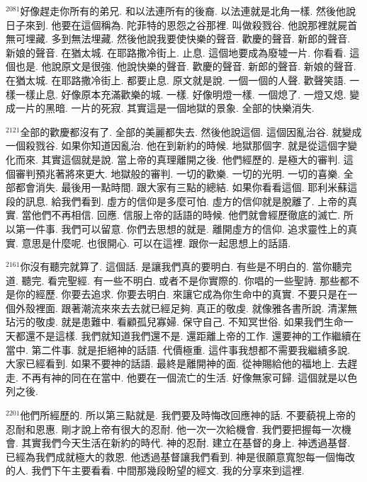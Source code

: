\documentclass{book}
\begin{document}
$^{2081}$好像趕走你所有的弟兄.
和以法連所有的後裔.
以法連就是北角一樣.
然後他說日子來到.
他要在這個稱為.
陀菲特的恩怨之谷那裡.
叫做殺戮谷.
他說那裡就屍首無可埋藏.
多到無法埋藏.
然後他說我要使快樂的聲音.
歡慶的聲音.
新郎的聲音.
新娘的聲音.
在猶太城.
在耶路撒冷街上.
止息.
這個地要成為廢墟一片.
你看看.
這個也是.
他說原文是很強.
他說快樂的聲音.
歡慶的聲音.
新郎的聲音.
新娘的聲音.
在猶太城.
在耶路撒冷街上.
都要止息.
原文就是說.
一個一個的人聲.
歡聲笑語.
一樣一樣止息.
好像原本充滿歡樂的城.
一樣.
好像明燈一樣.
一個熄了.
一燈又熄.
變成一片的黑暗.
一片的死寂.
其實這是一個地獄的景象.
全部的快樂消失.

$^{2121}$全部的歡慶都沒有了.
全部的美麗都失去.
然後他說這個.
這個因亂治谷.
就變成一個殺戮谷.
如果你知道因亂治.
他在到新約的時候.
地獄那個字.
就是從這個字變化而來.
其實這個就是說.
當上帝的真理離開之後.
他們經歷的.
是極大的審判.
這個審判預兆著將來更大.
地獄般的審判.
一切的歡樂.
一切的光明.
一切的喜樂.
全部都會消失.
最後用一點時間.
跟大家有三點的總結.
如果你看看這個.
耶利米蘇這段的訊息.
給我們看到.
虛方的信仰是多麼可怕.
虛方的信仰就是脫離了.
上帝的真實.
當他們不再相信.
回應.
信服上帝的話語的時候.
他們就會經歷徹底的滅亡.
所以第一件事.
我們可以留意.
你們去思想的就是.
離開虛方的信仰.
追求靈性上的真實.
意思是什麼呢.
也很開心.
可以在這裡.
跟你一起思想上的話語.

$^{2161}$你沒有聽完就算了.
這個話.
是讓我們真的要明白.
有些是不明白的.
當你聽完道.
聽完.
看完聖經.
有一些不明白.
或者不是你實際的.
你唱的一些聖詩.
那些都不是你的經歷.
你要去追求.
你要去明白.
來讓它成為你生命中的真實.
不要只是在一個外殼裡面.
跟著潮流來來去去就已經足夠.
真正的敬虔.
就像雅各書所說.
清潔無玷污的敬虔.
就是患難中.
看顧孤兒寡婦.
保守自己.
不知冥世俗.
如果我們生命一天都還不是這樣.
我們就知道我們還不是.
還距離上帝的工作.
還要神的工作繼續在當中.
第二件事.
就是拒絕神的話語.
代價極重.
這件事我想都不需要我繼續多說.
大家已經看到.
如果不要神的話語.
最終是離開神的面.
從神賜給他的福地上.
去趕走.
不再有神的同在在當中.
他要在一個流亡的生活.
好像無家可歸.
這個就是以色列之後.

$^{2201}$他們所經歷的.
所以第三點就是.
我們要及時悔改回應神的話.
不要藐視上帝的忍耐和恩惠.
剛才說上帝有很大的忍耐.
他一次一次給機會.
我們要把握每一次機會.
其實我們今天生活在新約的時代.
神的忍耐.
建立在基督的身上.
神透過基督.
已經為我們成就極大的救恩.
他透過基督讓我們看到.
神是很願意寬恕每一個悔改的人.
我們下午主要看看.
中間那幾段盼望的經文.
我的分享來到這裡.
\newpage
\end{document}
